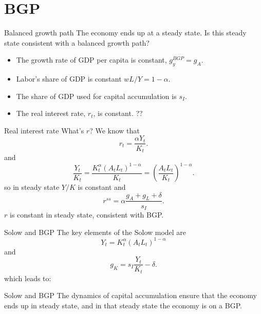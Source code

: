 \section{BGP}
\begin{frame}{Balanced growth path}
The economy ends up at a steady state. Is this steady state consistent with a balanced growth path?
\begin{itemize}
	\item The growth rate of GDP per capita is constant, $g_y^{BGP} = g_A$. \checkmark
	\item Labor's share of GDP is constant $wL/Y = 1-\alpha$. \checkmark
	\item The share of GDP used for capital accumulation is $s_I$. \checkmark
	\item The real interest rate, $r_t$, is constant. ??
\end{itemize}
\end{frame}

\begin{frame}{Real interest rate}
What's $r$? We know that
\begin{equation}
	r_t = \frac{\alpha Y_t}{K_t}. \label{EQ_r}
\end{equation}
and 
\begin{equation}
	\frac{Y_t}{K_t} = \frac{K_t^{\alpha}(A_tL_t)^{1-\alpha}}{K_t} = \left(\frac{A_tL_t}{K_t}\right)^{1-\alpha}. \nonumber
\end{equation}
so in steady state $Y/K$ is constant and
\begin{equation}
	r^{ss} = \alpha \frac{g_A + g_L + \delta}{s_I}.
\end{equation}
$r$ is constant in steady state, consistent with BGP. \checkmark
\end{frame}

\begin{frame}{Solow and BGP}
The key elements of the Solow model are
\begin{equation}
	Y_t = K_t^{\alpha} (A_tL_t)^{1-\alpha} \label{EQ_Production} \nonumber
\end{equation}
and 
\begin{equation}
	g_K = s_I \frac{Y_t}{K_t} - \delta. \nonumber
\end{equation}
which leads to:
\begin{block}{Solow and BGP}
The dynamics of capital accumulation ensure that the economy ends up in steady state, and in that steady state the economy is on a BGP.
\end{block}
\end{frame}

